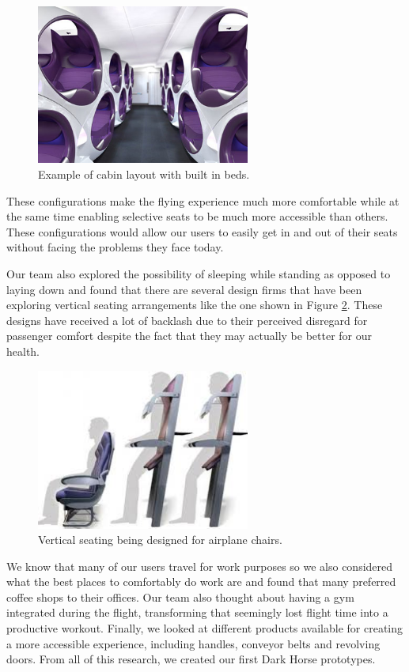 \begin{figure}[h]
  \centering
     \includegraphics[width=7cm]{images/purple_vertical_configuration.jpg}
   \caption{Example of cabin layout with built in beds. \cite{purple_vertical}}
  \label{fig:purple_vertical_configuration.png}
\end{figure} 

These configurations make the flying experience much more comfortable while at the same time enabling selective seats to be much more accessible than others. These configurations would allow our users to easily get in and out of their seats without facing the problems they face today.

Our team also explored the possibility of sleeping while standing as opposed to laying down and found that there are several design firms that have been exploring vertical seating arrangements like the one shown in Figure \ref{fig:vertical_seating.jpg}. These designs have received a lot of backlash due to their perceived disregard for passenger comfort despite the fact that they may actually be better for our health. 

\begin{figure}[h]
  \centering
     \includegraphics[width=7cm]{images/vertical_seating.jpg}
   \caption{Vertical seating being designed for airplane chairs. \cite{vertical_seating}}
  \label{fig:vertical_seating.jpg}
\end{figure} 

We know that many of our users travel for work purposes so we also considered what the best places to comfortably do work are and found that many preferred coffee shops to their offices. Our team also thought about having a gym integrated during the flight, transforming that seemingly lost flight time into a productive workout. Finally, we looked at different products available for creating a more accessible experience, including handles, conveyor belts and revolving doors. From all of this research, we created our first Dark Horse prototypes.

